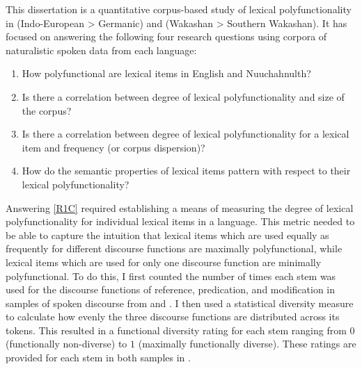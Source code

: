 This dissertation is a quantitative corpus-based study of lexical polyfunctionality in  (Indo-European > Germanic) and  (Wakashan > Southern Wakashan). It has focused on answering the following four research questions using corpora of naturalistic spoken data from each language:

\begin{enumerate}[
  label      = {\textbf{R\arabic*:}},
  leftmargin = *,
  ref        = {R\arabic*}
]
  \item\label{R1C} How polyfunctional are lexical items in English and Nuuchahnulth?
  \item\label{R2C} Is there a correlation between degree of lexical polyfunctionality and size of the corpus?
  \item\label{R3C} Is there a correlation between degree of lexical polyfunctionality for a lexical item and frequency (or corpus dispersion)?
  \item\label{R4C} How do the semantic properties of lexical items pattern with respect to their lexical polyfunctionality?
\end{enumerate}

Answering \ref{R1C} required establishing a means of measuring the degree of lexical polyfunctionality for individual lexical items in a language. This metric needed to be able to capture the intuition that lexical items which are used equally as frequently for different discourse functions are maximally polyfunctional, while lexical items which are used for only one discourse function are minimally polyfunctional. To do this, I first counted the number of times each stem was used for the discourse functions of reference, predication, and modification in samples of spoken discourse from  and . I then used a statistical diversity measure  to calculate how evenly the three discourse functions are distributed across its tokens. This resulted in a functional diversity rating for each stem ranging from $0$ (functionally non-diverse) to $1$ (maximally functionally diverse). These ratings are provided for each stem in both samples in .

